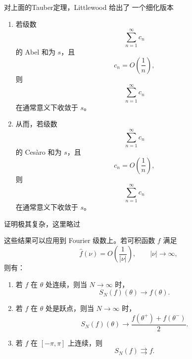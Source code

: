 对上面的Tauber定理，Littlewood 给出了 一个细化版本
\begin{proposition}
	\begin{enumerate}
		\item[(a)] 若级数
		\[
		\sum_{n=1}^{\infty}c_n
		\]
		的 Abel 和为 $s$，且
		\[
		c_n=O\left(\frac{1}{n}\right),
		\]
		则
		\[
		\sum_{n=1}^{\infty}c_n
		\]
		在通常意义下收敛于 $s$。
		
		\item[(b)] 从而，若级数
		\[
		\sum_{n=1}^{\infty}c_n
		\]
		的 Ces\`aro 和为 $s$，且
		\[
		c_n=O\left(\frac{1}{n}\right),
		\]
		则
		\[
		\sum_{n=1}^{\infty}c_n
		\]
		在通常意义下收敛于 $s$。
	\end{enumerate}
\end{proposition}
证明极其复杂，这里略过

这些结果可以应用到 Fourier 级数上。若可积函数 $f$
满足
\[
\widehat{f}(\nu)
=O\left(\frac{1}{|\nu|}\right),
\qquad |\nu|\to\infty,
\]
则有：

\begin{enumerate}
	\item[(i)] 若 $f$ 在 $\theta$ 处连续，则当 $N\to\infty$ 时，
	\[
	S_N(f)(\theta)\to f(\theta).
	\]
	
	\item[(ii)] 若 $f$ 在 $\theta$ 处是跃点，则当 $N\to\infty$ 时，
	\[
	S_N(f)(\theta)
	\to
	\frac{f(\theta^+)+f(\theta^-)}{2}.
	\]
	
	\item[(iii)] 若 $f$ 在 $[-\pi,\pi]$ 上连续，则
	\[
	S_N(f)\rightrightarrows f.
	\]
\end{enumerate}

